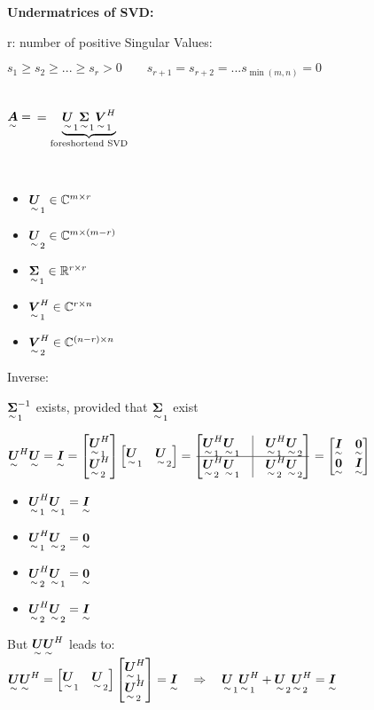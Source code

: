 \vspace{5mm} 
\textbf{Undermatrices of SVD:}

r: number of positive Singular Values:

$s_1\geq s_2\geq ...\geq s_r > 0   \qquad  s_{r+1}=s_{r+2}=...s_{\min(m,n)}=0$

\ \\

$\ma{A}=$\quad {}   \quad
$=\underbrace{\ma{U}_1\ma{\Sigma}_1\ma{V}_1^H}_{\textrm{foreshortend SVD}}$

\ \\

\begin{itemize}
\item $\ma{U}_1 \in \mathbb{C}^{m\times r}$
\item $\ma{U}_2 \in \mathbb{C}^{m\times (m-r)}$
\item $\ma{\Sigma}_1 \in \mathbb{R}^{r\times r}$
\item $\ma{V}_1^H \in \mathbb{C}^{r\times n}$
\item $\ma{V}_2^H \in \mathbb{C}^{(n-r)\times n}$
\end{itemize}

Inverse:

$\ma{\Sigma}_1^{-1}$ exists, provided that $\ma{\Sigma}_1$ exist

$\ma{U}^H\ma{U}=\ma{I}=\mat{\ma{U}_1^H\\\ma{U}_2^H} \mat{\ma{U}_1&\ma{U}_2} 
=\mat{\ma{U}_1^H\ma{U}_1 &\vline& \ma{U}_1^H\ma{U}_2 \\ \hline \ma{U}_2^H\ma{U}_1 &\vline& \ma{U}_2^H\ma{U}_2} = \mat{\ma{I}&\ma{0}\\\ma{0}&\ma{I}}$
\begin{itemize}
\item $\ma{U}_1^H\ma{U}_1 = \ma{I}$
\item $\ma{U}_1^H\ma{U}_2 = \ma{0}$
\item $\ma{U}_2^H\ma{U}_1 = \ma{0}$
\item$\ma{U}_2^H\ma{U}_2 = \ma{I}$
\end{itemize}

But $\ma{U}\ma{U}^H$ leads to:\\
$\ma{U}\ma{U}^H=\mat{\ma{U}_1 &\ma{U}_2}\mat{\ma{U}_1^H \\\ma{U}_2^H}=\ma{I}  \pfeil \ma{U}_1 \ma{U}_1^H+\ma{U}_2 \ma{U}_2^H=\ma{I}$



